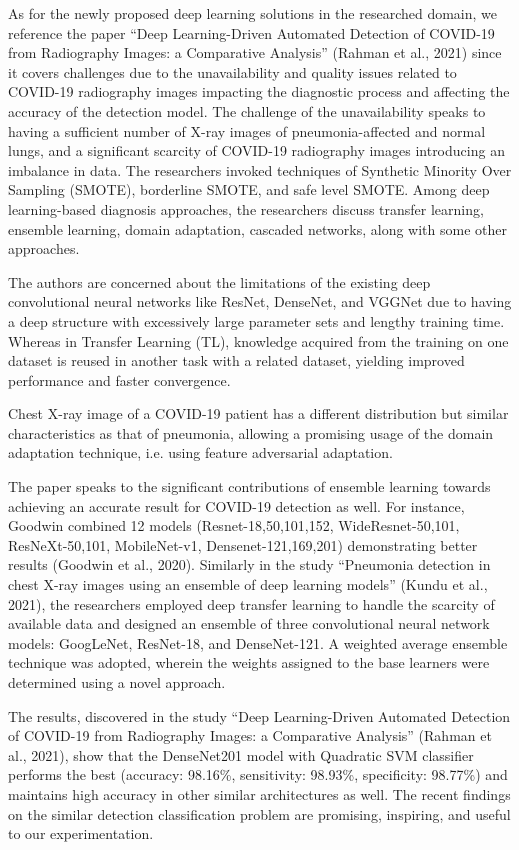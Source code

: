 \documentclass[12pt, twocolumn]{CUP-JNL-PPS}
\begin{document}
As for the newly proposed deep learning solutions in the researched
domain, we reference the paper “Deep Learning-Driven Automated Detection of
COVID-19 from Radiography Images: a Comparative Analysis” (Rahman et al.,
2021) since it covers challenges due to the unavailability and quality issues related
to COVID-19 radiography images impacting the diagnostic process and affecting
the accuracy of the detection model. The challenge of the unavailability speaks
to having a sufficient number of X-ray images of pneumonia-affected and normal
lungs, and a significant scarcity of COVID-19 radiography images introducing an
imbalance in data. The researchers invoked techniques of Synthetic Minority Over
Sampling (SMOTE), borderline SMOTE, and safe level SMOTE. Among deep
learning-based diagnosis approaches, the researchers discuss transfer learning,
ensemble learning, domain adaptation, cascaded networks, along with some other
approaches.

The authors are concerned about the limitations of the existing deep
convolutional neural networks like ResNet, DenseNet, and VGGNet due to having
a deep structure with excessively large parameter sets and lengthy training time.
Whereas in Transfer Learning (TL), knowledge acquired from the training on
one dataset is reused in another task with a related dataset, yielding improved
performance and faster convergence.

Chest X-ray image of a COVID-19 patient has a different distribution
but similar characteristics as that of pneumonia, allowing a promising usage of the
domain adaptation technique, i.e. using feature adversarial adaptation.

The paper speaks to the significant contributions of ensemble learning towards achieving an accurate result for COVID-19 detection as well. For
instance, Goodwin combined 12 models (Resnet-18,50,101,152, WideResnet-50,101, ResNeXt-50,101, MobileNet-v1, Densenet-121,169,201) demonstrating
better results (Goodwin et al., 2020). Similarly in the study “Pneumonia detection
in chest X-ray images using an ensemble of deep learning models” (Kundu et al.,
2021), the researchers employed deep transfer learning to handle the scarcity of
available data and designed an ensemble of three convolutional neural network
models: GoogLeNet, ResNet-18, and DenseNet-121. A weighted average ensemble technique was adopted, wherein the weights assigned to the base learners were
determined using a novel approach.

The results, discovered in the study “Deep Learning-Driven Automated
Detection of COVID-19 from Radiography Images: a Comparative Analysis”
(Rahman et al., 2021), show that the DenseNet201 model with Quadratic SVM
classifier performs the best (accuracy: 98.16\%, sensitivity: 98.93\%, specificity:
98.77\%) and maintains high accuracy in other similar architectures as well.
The recent findings on the similar detection classification problem are
promising, inspiring, and useful to our experimentation.
\end{document}
